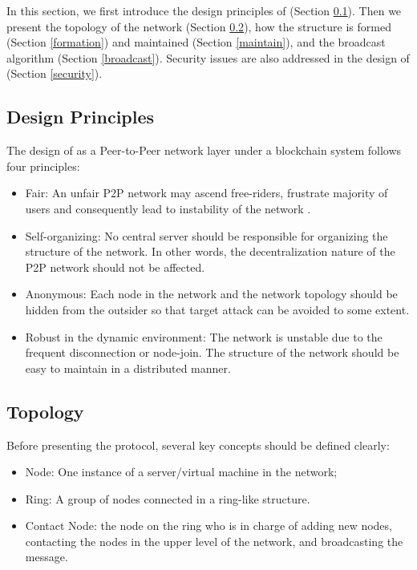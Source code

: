 In this section, we first introduce the design principles of \xxx (Section \cref{principles}). Then we present the topology of the network (Section \cref{topo}), how the structure is formed (Section \cref{formation}) and maintained (Section \cref{maintain}), and the broadcast algorithm (Section \cref{broadcast}). Security issues are also addressed in the design of \xxx (Section \cref{security}).

\subsection{Design Principles} \label{principles}

The design of \xxx as a Peer-to-Peer network layer under a blockchain system follows four principles:
\noindent
\begin{itemize}[noitemsep, topsep=0pt]
	\item Fair: An unfair P2P network may ascend free-riders, frustrate majority of users and consequently lead to instability of the network \cite{naghizadeh2016improving}.
	\item Self-organizing: No central server should be responsible for organizing the structure of the network. In other words, the decentralization nature of the P2P network should not be affected.
	\item Anonymous: Each node in the network and the network topology should be hidden from the outsider so that target attack can be avoided to some extent.
	\item Robust in the dynamic environment: The network is unstable due to the frequent disconnection or node-join. The structure of the network should be easy to maintain in a distributed manner.
\end{itemize}


\subsection{Topology} \label{topo}

Before presenting the protocol, several key concepts should be defined clearly:
\begin{itemize}[noitemsep, topsep=0pt]
	\item Node: One instance of a server/virtual machine in the network;
	\item Ring: A group of nodes connected in a ring-like structure.
	\item Contact Node: the node on the ring who is in charge of adding new nodes, contacting the nodes in the upper level of the network, and broadcasting the message.\\
\end{itemize}

